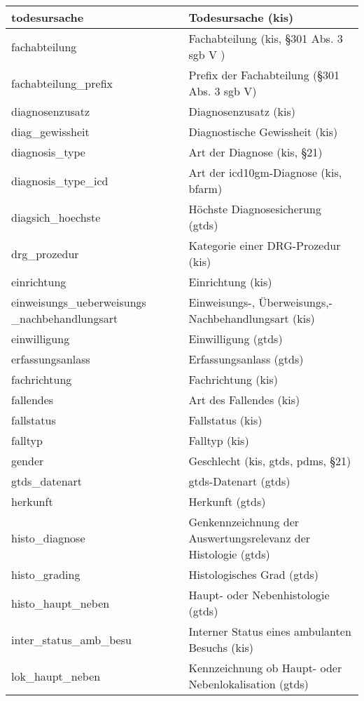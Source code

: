 \begin{longtable}{||p{5.3cm}|p{9cm}||}
  	todesursache & Todesursache (\ac{kis}) \\ \hline
  	fachabteilung & Fachabteilung (\ac{kis}, \S 301 Abs. 3 \acs{sgb} V ) \\ \hline
  	fachabteilung\_prefix & Prefix der Fachabteilung (\S 301 Abs. 3 \acs{sgb} V)\\ \hline
  	diagnosenzusatz & Diagnosenzusatz (\ac{kis}) \\ \hline
  	diag\_gewissheit & Diagnostische Gewissheit (\ac{kis}) \\ \hline
  	diagnosis\_type & Art der Diagnose (\ac{kis}, \S 21) \\ \hline
  	diagnosis\_type\_icd & Art der \acs{icd10gm}-Diagnose (\ac{kis}, \acs{bfarm})\\ \hline
  	diagsich\_hoechste & Höchste Diagnosesicherung (\ac{gtds})\\ \hline
  	drg\_prozedur & Kategorie einer DRG-Prozedur (\ac{kis})\\ \hline
  	einrichtung & Einrichtung (\ac{kis})\\ \hline
  	einweisungs\_ueberweisungs \_nachbehandlungsart & Einweisungs-, Überweisungs,- Nachbehandlungsart (\ac{kis})\\ \hline
  	einwilligung & Einwilligung (\ac{gtds})\\ \hline
  	erfassungsanlass & Erfassungsanlass (\ac{gtds}) \\ \hline
  	fachrichtung & Fachrichtung (\ac{kis})\\ \hline
  	fallendes & Art des Fallendes (\ac{kis})\\ \hline
  	fallstatus & Fallstatus (\ac{kis})\\ \hline
  	falltyp & Falltyp (\ac{kis})\\ \hline
  	gender & Geschlecht (\ac{kis}, \ac{gtds}, \ac{pdms}, \S 21)\\ \hline
  	gtds\_datenart & \ac{gtds}-Datenart (\ac{gtds})\\ \hline
  	herkunft & Herkunft (\ac{gtds})\\ \hline
  	histo\_diagnose & Genkennzeichnung der Auswertungsrelevanz der Histologie  (\ac{gtds})\\ \hline
  	histo\_grading & Histologisches Grad (\ac{gtds})\\ \hline
  	histo\_haupt\_neben & Haupt- oder Nebenhistologie (\ac{gtds})\\ \hline
  	inter\_status\_amb\_besu & Interner Status eines ambulanten Besuchs (\ac{kis})\\ \hline
  	lok\_haupt\_neben & Kennzeichnung ob Haupt- oder Nebenlokalisation (\ac{gtds}) \\ \hline

\end{longtable}

